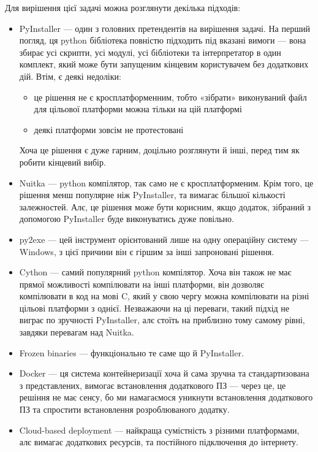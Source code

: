 \documentclass[14pt]{extarticle}
\begin{document}
  Для вирішення цієї задачі можна розглянути декілька підходів:
  \begin{itemize}[labelindent=\dimexpr{}\relax, leftmargin=*]
    \item PyInstaller \cite{pyinstaller} ---
      один з головних претендентів на вирішення задачі.
      На перший погляд,
      ця python бібліотека повністю підходить під вказані вимоги ---
      вона збирає усі скрипти, усі модулі,
      усі бібліотеки та інтерпретатор в один комплект,
      який може бути запущеним кінцевим користувачем без додаткових дій.
      Втім, є деякі недоліки:
      \begin{itemize}
        \item це рішення не є кросплатформенним, тобто «зібрати» виконуваний файл для цільової платформи можна тільки на цій платформі
        \item деякі платформи зовсім не протестовані
      \end{itemize}
      Хоча це рішення є дуже гарним, доцільно розглянути й інші,
      перед тим як робити кінцевий вибір.
    
    \item Nuitka \cite{nuitka} --- python компілятор,
      так само не є кросплатформеним.
      Крім того, це рішення менш популярне ніж PyInstaller,
      та вимагає більшої кількості залежностей.
      Алє, це рішення може бути корисним, якщо додаток,
      зібраний з допомогою PyInstaller буде виконуватись дуже повільно.

    \item py2exe \cite{py2exe} --- цей інструмент орієнтований лише на одну
      операційну систему --- Windows,
      з цієї причини він є гіршим за інші запроновані рішення.
    
    \item Cython \cite{cython} --- самий популярний python компілятор.
    Хоча він також не має прямої можливості компілювати на інші платформи,
    він дозволяє компілювати в код на мові C,
    який у свою чергу можна компілювати на різні цільові платформи з однієї.
    Незважаючи на ці переваги, такий підхід не виграє по зручності PyInstaller,
    алє стоїть на приблизно тому самому рівні, завдяки перевагам над Nuitka.
    
    \item Frozen binaries \cite{github_cpython_freeze} ---
      функціонально те саме що й PyInstaller.
    
    \item Docker \cite{docker} ---
      ця система контейнеризації хоча й сама зручна та стандартизована
      з представлених, вимогає встановлення додаткового ПЗ ---
      через це, це решіння не має сенсу,
      бо ми намагаємося уникнути встановлення додаткового ПЗ
      та спростити встановлення розроблюваного додатку.
    
    \item Cloud-based deployment \cite{wiki_cloud_computing} ---
      найкраща сумістність з різними платформами,
      алє вимагає додаткових ресурсів, та постійного підключення до інтернету.
  \end{itemize}
\end{document}
